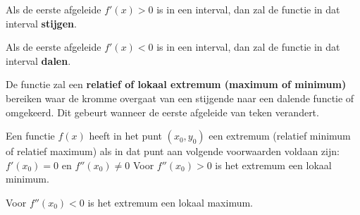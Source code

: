\begin{eigenschap}
Als de eerste afgeleide $f'(x)>0$  is in een interval, dan zal de functie in dat interval \textbf{stijgen}.

Als de eerste afgeleide $f'(x)<0$ is in een interval, dan zal de functie in dat interval \textbf{dalen}.

De functie zal een \textbf{relatief of lokaal extremum (maximum of minimum)} bereiken waar de kromme overgaat van een stijgende naar een dalende functie of omgekeerd. Dit gebeurt wanneer de eerste afgeleide van teken verandert.

Een functie $f(x)$  heeft in het punt $(x_0,y_0)$ een extremum (relatief minimum of relatief maximum) als in dat punt aan volgende voorwaarden voldaan zijn:
$f'(x_0)=0$
en $f''(x_0)\ne 0$
Voor $f''(x_0)> 0$ is het extremum een lokaal minimum.

Voor $f''(x_0)< 0$ is het extremum een lokaal maximum.
\end{eigenschap}


